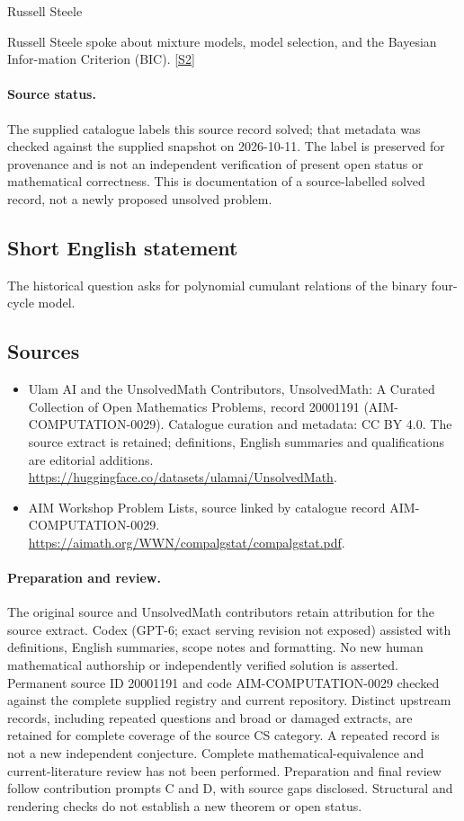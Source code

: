 \documentclass[11pt]{article}
\newcommand{\sref}[2]{\hyperlink{source:#1:#2}{[S#2]}}
\begin{document}
Russell Steele

Russell Steele spoke about mixture models, model selection, and the Bayesian Infor-mation Criterion (BIC). \sref{20001191}{2}
\paragraph{Source status.}
The supplied catalogue labels this source record solved; that metadata was checked against the supplied snapshot on 2026-10-11. The label is preserved for provenance and is not an independent verification of present open status or mathematical correctness. This is documentation of a source-labelled solved record, not a newly proposed unsolved problem.
\subsection{Short English statement}
The historical question asks for polynomial cumulant relations of the binary four-cycle model.
\subsection{Sources}
\begin{itemize}
\item[\hypertarget{source:20001191:1}{S1}] Ulam AI and the UnsolvedMath Contributors, UnsolvedMath: A Curated Collection of Open Mathematics Problems, record 20001191 (AIM-COMPUTATION-0029). Catalogue curation and metadata: CC BY 4.0. The source extract is retained; definitions, English summaries and qualifications are editorial additions.
\url{https://huggingface.co/datasets/ulamai/UnsolvedMath}.
\item[\hypertarget{source:20001191:2}{S2}] AIM Workshop Problem Lists, source linked by catalogue record AIM-COMPUTATION-0029.
\url{https://aimath.org/WWN/compalgstat/compalgstat.pdf}.
\end{itemize}
\paragraph{Preparation and review.}
The original source and UnsolvedMath contributors retain attribution for the source extract. Codex (GPT-6; exact serving revision not exposed) assisted with definitions, English summaries, scope notes and formatting. No new human mathematical authorship or independently verified solution is asserted. Permanent source ID 20001191 and code AIM-COMPUTATION-0029 checked against the complete supplied registry and current repository. Distinct upstream records, including repeated questions and broad or damaged extracts, are retained for complete coverage of the source CS category. A repeated record is not a new independent conjecture. Complete mathematical-equivalence and current-literature review has not been performed. Preparation and final review follow contribution prompts C and D, with source gaps disclosed. Structural and rendering checks do not establish a new theorem or open status.
\label{end:20001191}
\end{document}

